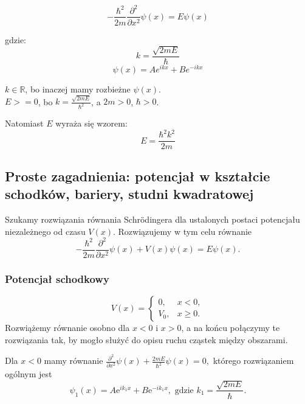 \begin{equation*}
    - \frac{\hbar^2}{2m} \frac{\partial^2}{\partial x^2} \psi(x) = E \psi(x)
\end{equation*}

gdzie:
\begin{equation*}
    k = \frac{\sqrt{2mE}}{\hbar}
\end{equation*}
\begin{equation*}
    \psi(x) = A e^{ikx} + B e^{-ikx}
\end{equation*}

$ k \in \mathbb{R} $, bo inaczej mamy rozbieżne $\psi(x)$. \\
$ E >= 0 $, bo $ k = \frac{\sqrt{2mE}}{\hbar^2} $, a $ 2m > 0 $, $ \hbar > 0 $.

Natomiast $E$ wyraża się wzorem:
\begin{equation*}
    E = \frac{\hbar^2 k^2}{2m}
\end{equation*}

\subsection{Proste zagadnienia: potencjał w kształcie schodków, bariery, studni kwadratowej}
Szukamy rozwiązania równania Schrödingera dla ustalonych postaci potencjału niezależnego od czasu $V(x)$. Rozwiązujemy w tym celu równanie
\begin{equation*}
	-\frac{\hbar^2}{2m} \frac{\partial^2}{\partial x^2} \psi(x) + V(x)\psi(x) = E\psi(x).
\end{equation*}

\subsubsection*{Potencjał schodkowy}
\begin{equation*}
	V(x) = \begin{cases}
		0, &x < 0,\\
		V_0, &x \geq 0.
	\end{cases}
\end{equation*}
Rozwiążemy równanie osobno dla $x < 0$ i $x > 0$, a na końcu połączymy te rozwiązania tak, by mogło służyć do opisu ruchu cząstek między obszarami.

Dla $x < 0$ mamy równanie $\frac{\partial^2}{\partial x^2} \psi(x) + \frac{2mE}{\hbar^2}\psi(x) = 0,$ którego rozwiązaniem ogólnym jest 
\begin{equation*}
	\psi_1(x) = A \mathrm{e}^{i k_1 x} + B \mathrm{e}^{-i k_1 x}, \text{ gdzie } k_1 = \frac{\sqrt{2mE}}{\hbar}.
\end{equation*}

